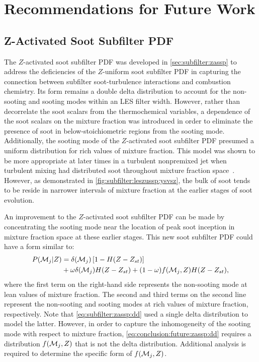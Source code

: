 \section{Recommendations for Future Work}
\label{sec:conclusion:future}

\subsection{Z-Activated Soot Subfilter PDF}
\label{sec:conclusion:future:zassp}

The $Z$-activated soot subfilter PDF was developed in \cref{sec:subfilter:zassp} to address the deficiencies of the $Z$-uniform soot subfilter PDF in capturing the connection between subfilter soot-turbulence interactions and combustion chemistry. Its form remains a double delta distribution to account for the non-sooting and sooting modes within an LES filter width. However, rather than decorrelate the soot scalars from the thermochemical variables, a dependence of the soot scalars on the mixture fraction was introduced in order to eliminate the presence of soot in below-stoichiometric regions from the sooting mode. Additionally, the sooting mode of the $Z$-activated soot subfilter PDF presumed a uniform distribution for rich values of mixture fraction. This model was shown to be more appropriate at later times in a turbulent nonpremixed jet when turbulent mixing had distributed soot throughout mixture fraction space~\cite{attili2014}. However, as demonstrated in \cref{fig:subfilter:leszussp:ysvsz}, the bulk of soot tends to be reside in narrower intervals of mixture fraction at the earlier stages of soot evolution.

An improvement to the $Z$-activated soot subfilter PDF can be made by concentrating the sooting mode near the location of peak soot inception in mixture fraction space at these earlier stages. This new soot subfilter PDF could have a form similar to:
\begin{equation}\label{eq:conclusion:future:zassp:dd}
  \begin{split}
    P(\mathcal{M}_j|Z) &= \delta(\mathcal{M}_j)\left[ 1 - H(Z - Z_{st}) \right] \\
    &+ \omega\delta(\mathcal{M}_j)H(Z - Z_{st}) + (1 - \omega)f(\mathcal{M}_j, Z)H(Z - Z_{st}),
  \end{split}
\end{equation}
where the first term on the right-hand side represents the non-sooting mode at lean values of mixture fraction. The second and third terms on the second line represent the non-sooting and sooting modes at rich values of mixture fraction, respectively. Note that \cref{eq:subfilter:zassp:dd} used a single delta distribution to model the latter. However, in order to capture the inhomogeneity of the sooting mode with respect to mixture fraction, \cref{eq:conclusion:future:zassp:dd} requires a distribution $f(\mathcal{M}_j, Z)$ that is not the delta distribution. Additional analysis is required to determine the specific form of $f(\mathcal{M}_j, Z)$.


